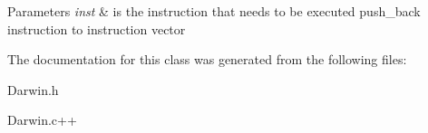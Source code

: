 \begin{DoxyParams}{\-Parameters}
{\em inst} & is the instruction that needs to be executed push\-\_\-back instruction to instruction vector \\
\hline
\end{DoxyParams}


\-The documentation for this class was generated from the following files\-:\begin{DoxyCompactItemize}
\item 
\-Darwin.\-h\item 
\-Darwin.\-c++\end{DoxyCompactItemize}
